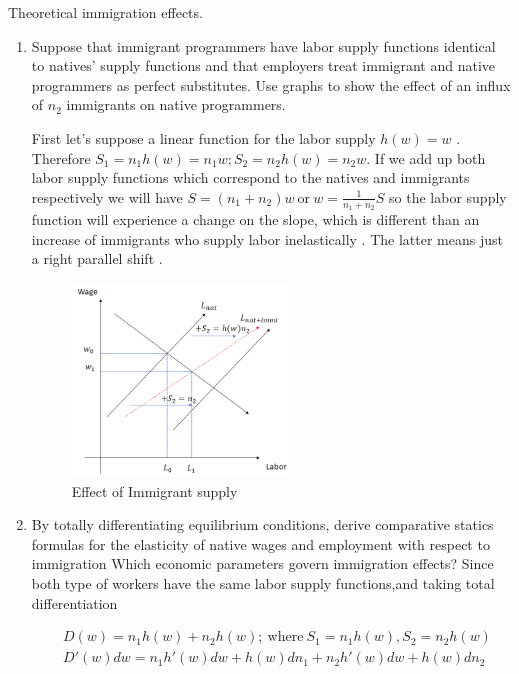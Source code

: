 Theoretical immigration effects. 

\begin{enumerate}[label=(\alph*)]

\item 
Suppose that immigrant programmers have labor supply functions identical to natives’ supply functions and that employers treat immigrant and native programmers as perfect substitutes. Use graphs to show the effect of an influx of $n_2$ immigrants on native programmers.

First let's suppose a linear function for the labor supply $h(w) = w$ . Therefore $S_1 = n_1h(w) = n_1w ; S_2 = n_2h(w)=n_2w$. If we add up both labor supply functions which correspond to the natives and immigrants respectively we will have $S = (n_1 + n_2)w \ \text{or} \ w =\frac{1}{n_1 + n_2}S $ so the labor supply function will experience a change on the slope, which is different than an increase of immigrants who supply labor inelastically . The latter means just a right parallel shift .  

\begin{figure}[H]
    \centering
    \includegraphics[width=0.55\textwidth]{Images/immigrant_effect.png}
    \caption{Effect of Immigrant supply}
    \label{fig:immigrants}
\end{figure}


\item 
By totally differentiating equilibrium conditions, derive comparative statics formulas for the elasticity of native wages and employment with respect to immigration Which economic parameters govern immigration effects? Since both type of workers have the same labor supply functions,and taking total differentiation 

\begin{equation}
\begin{aligned}
 & D(w) = n_1h(w) + n_2h(w) ;\ \text{where}  \ S_1 = n_1h(w) , S_2 = n_2h(w)  \\
 & D'(w)dw = n_1h'(w)dw + h(w)dn_1 +n_2h'(w)dw + h(w)dn_2
\end{aligned}
\end{equation}


\end{enumerate}
